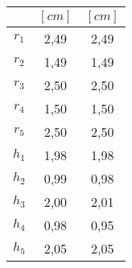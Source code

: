 \begin{table}
 \centering
\begin{tabular}{c c c }
\multicolumn{1}{l}{} & \multicolumn{1}{c}{$[cm]$} & \multicolumn{1}{c}{$[cm]$} \\ 
\toprule
$r_1$& 2,49 & 2,49 \\
$r_2$& 1,49 & 1,49 \\ 
$r_3$& 2,50 & 2,50 \\
$r_4$& 1,50 & 1,50\\
$r_5$& 2,50 & 2,50 \\
$h_1$& 1,98 & 1,98 \\
$h_2$& 0,99 & 0,98 \\
$h_3$& 2,00 & 2,01 \\
$h_4$& 0,98 & 0,95\\
$h_5$& 2,05 & 2,05\\
\end{tabular}
\end{table}
